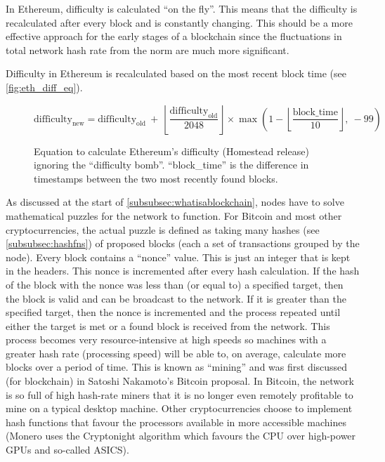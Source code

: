 \documentclass{article}
\begin{document}
In Ethereum, difficulty is calculated ``on the fly''. This means that the difficulty is recalculated after every block and is constantly changing. This should be a more effective approach for the early stages of a blockchain since the fluctuations in total network hash rate from the norm are much more significant.

Difficulty in Ethereum is recalculated based on the most recent block time (see \autoref{fig:eth_diff_eq}).
\begin{figure}[h]
    \[\textrm{difficulty}_{\textrm{new}} = \textrm{difficulty}_{\textrm{old}}
    \ + \ \left\lfloor\dfrac{\textrm{difficulty}_{\textrm{old}}}{2048}\right\rfloor \times \max\left(1- \left\lfloor \frac{\textrm{block\_time}}{10} \right\rfloor,\ -99\right)\]
    \caption{Equation to calculate Ethereum's difficulty (Homestead release) ignoring the ``difficulty bomb''\cite{medium_bt_mystery}. ``block\_time'' is the difference in timestamps between the two most recently found blocks.}
    \label{fig:eth_diff_eq}
\end{figure}

As discussed at the start of \autoref{subsubsec:whatisablockchain}, nodes have to solve mathematical puzzles for the network to function. For Bitcoin and most other cryptocurrencies, the actual puzzle is defined as taking many hashes (see \autoref{subsubsec:hashfns}) of proposed blocks (each a set of transactions grouped by the node). Every block contains a ``nonce'' value. This is just an integer that is kept in the headers. This nonce is incremented after every hash calculation. If the hash of the block with the nonce was less than (or equal to) a specified target, then the block is valid and can be broadcast to the network. If it is greater than the specified target, then the nonce is incremented and the process repeated until either the target is met or a found block is received from the network. This process becomes very resource-intensive at high speeds so machines with a greater hash rate (processing speed) will be able to, on average, calculate more blocks over a period of time. This is known as ``mining'' and was first discussed (for blockchain) in Satoshi Nakamoto's Bitcoin proposal\cite{bitcoin_paper}. In Bitcoin, the network is so full of high hash-rate miners that it is no longer even remotely profitable to mine on a typical desktop machine. Other cryptocurrencies choose to implement hash functions that favour the processors available in more accessible machines (Monero uses the Cryptonight algorithm\cite{cryptonight_docs} which favours the CPU over high-power GPUs and so-called ASICS).
\end{document}
